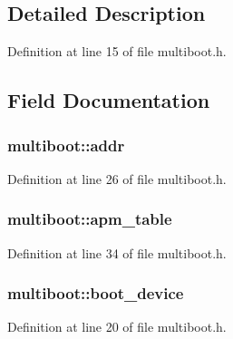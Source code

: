 \subsection{Detailed Description}


Definition at line 15 of file multiboot.\+h.



\subsection{Field Documentation}
\subsubsection[{\texorpdfstring{addr}{addr}}]{ multiboot\+::addr}\hypertarget{structmultiboot_a4d918603df569ac9a6dd1f1f51b69afd}{}\label{structmultiboot_a4d918603df569ac9a6dd1f1f51b69afd}


Definition at line 26 of file multiboot.\+h.

\subsubsection[{\texorpdfstring{apm\+\_\+table}{apm_table}}]{ multiboot\+::apm\+\_\+table}\hypertarget{structmultiboot_a9c3af22a226810b2baebaf6b56ef16f2}{}\label{structmultiboot_a9c3af22a226810b2baebaf6b56ef16f2}


Definition at line 34 of file multiboot.\+h.

\subsubsection[{\texorpdfstring{boot\+\_\+device}{boot_device}}]{ multiboot\+::boot\+\_\+device}\hypertarget{structmultiboot_aa18ec4a3b40666f5319a43e0f39e4db6}{}\label{structmultiboot_aa18ec4a3b40666f5319a43e0f39e4db6}


Definition at line 20 of file multiboot.\+h.

